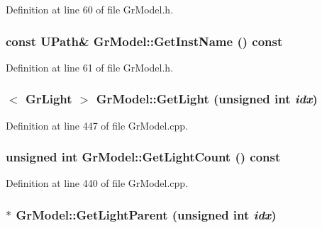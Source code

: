 Definition at line 60 of file GrModel.h.\hypertarget{class_gr_model_e8a075163c88d6bf6623db37d65cd17a}{
\subsubsection[{GetInstName}]{\setlength{\rightskip}{0pt plus 5cm}const {\bf UPath}\& GrModel::GetInstName () const}}
\label{class_gr_model_e8a075163c88d6bf6623db37d65cd17a}




Definition at line 61 of file GrModel.h.\hypertarget{class_gr_model_6f9177f0b2648997f0cb8dd4da0a481b}{
\subsubsection[{GetLight}]{$<$ {\bf GrLight} $>$ GrModel::GetLight (unsigned int {\em idx})}}
\label{class_gr_model_6f9177f0b2648997f0cb8dd4da0a481b}




Definition at line 447 of file GrModel.cpp.\hypertarget{class_gr_model_fbd44f70a2b06c82884eac31c40baeab}{
\subsubsection[{GetLightCount}]{\setlength{\rightskip}{0pt plus 5cm}unsigned int GrModel::GetLightCount () const}}
\label{class_gr_model_fbd44f70a2b06c82884eac31c40baeab}




Definition at line 440 of file GrModel.cpp.\hypertarget{class_gr_model_7ff4ed21e0a840da8ce5570b31b68a15}{
\subsubsection[{GetLightParent}]{ $\ast$ GrModel::GetLightParent (unsigned int {\em idx})}}
\label{class_gr_model_7ff4ed21e0a840da8ce5570b31b68a15}




